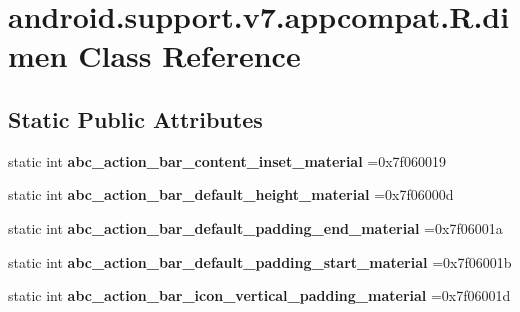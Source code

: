 \hypertarget{classandroid_1_1support_1_1v7_1_1appcompat_1_1R_1_1dimen}{}\section{android.\+support.\+v7.\+appcompat.\+R.\+dimen Class Reference}
\label{classandroid_1_1support_1_1v7_1_1appcompat_1_1R_1_1dimen}
\subsection*{Static Public Attributes}
\begin{DoxyCompactItemize}
\item 
\mbox{\label{classandroid_1_1support_1_1v7_1_1appcompat_1_1R_1_1dimen_a1f7148fdf542af9eb251e5c93c0f5ee6}} 
static int {\bfseries abc\+\_\+action\+\_\+bar\+\_\+content\+\_\+inset\+\_\+material} =0x7f060019
\item 
\mbox{\label{classandroid_1_1support_1_1v7_1_1appcompat_1_1R_1_1dimen_aa600e8a02d4de3dd429e967385a73c2a}} 
static int {\bfseries abc\+\_\+action\+\_\+bar\+\_\+default\+\_\+height\+\_\+material} =0x7f06000d
\item 
\mbox{\label{classandroid_1_1support_1_1v7_1_1appcompat_1_1R_1_1dimen_adc4980ec6bb030dfda2b8fefbc553ef9}} 
static int {\bfseries abc\+\_\+action\+\_\+bar\+\_\+default\+\_\+padding\+\_\+end\+\_\+material} =0x7f06001a
\item 
\mbox{\label{classandroid_1_1support_1_1v7_1_1appcompat_1_1R_1_1dimen_a6e8f43ab45e8dbcab43d13d5a05eb8ce}} 
static int {\bfseries abc\+\_\+action\+\_\+bar\+\_\+default\+\_\+padding\+\_\+start\+\_\+material} =0x7f06001b
\item 
\mbox{\label{classandroid_1_1support_1_1v7_1_1appcompat_1_1R_1_1dimen_a229a0d8e4ac809d87a054a6349a1f5e6}} 
static int {\bfseries abc\+\_\+action\+\_\+bar\+\_\+icon\+\_\+vertical\+\_\+padding\+\_\+material} =0x7f06001d
\item 

\end{DoxyCompactItemize}
